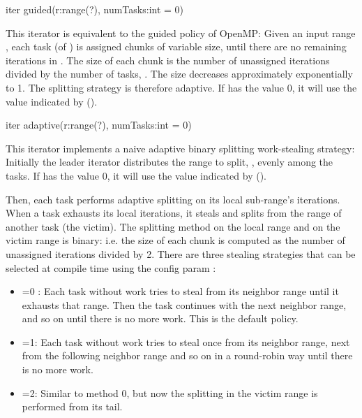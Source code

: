 \begin{protohead}
iter guided(r:range(?), numTasks:int = 0)
\end{protohead}
\begin{protobody}
  This iterator is equivalent to the guided policy of OpenMP: Given an
  input range , each task (of ) is assigned
  chunks of variable size, until there are no remaining iterations in
  . The size of each chunk is the number of unassigned
  iterations divided by the number of tasks, . The size
  decreases approximately exponentially to 1. The splitting strategy
  is therefore adaptive.  If  has the value 0, it will
  use the value indicated by 
  ().

\end{protobody}

\begin{protohead}
iter adaptive(r:range(?), numTasks:int = 0)
\end{protohead}
\begin{protobody}
  This iterator implements a naive adaptive binary splitting
  work-stealing strategy: Initially the leader iterator distributes
  the range to split, , evenly among the 
  tasks.  If  has the value 0, it will use the value
  indicated by 
  ().

  Then, each task performs adaptive splitting on its local
  sub-range's iterations. When a task exhausts its local iterations,
  it steals and splits from the range of another task (the
  victim). The splitting method on the local range and on the victim
  range is binary: i.e. the size of each chunk is computed as the
  number of unassigned iterations divided by 2. There are three
  stealing strategies that can be selected at compile time using the
  config param :

\begin{itemize}

\item {}=0 : Each task without work tries to steal
  from its neighbor range until it exhausts that range. Then the task
  continues with the next neighbor range, and so on until there is no
  more work.  This is the default policy.

\item {}=1: Each task without work tries to steal
  once from its neighbor range, next from the following neighbor range
  and so on in a round-robin way until there is no more work.

\item {}=2: Similar to method 0, but now the
  splitting in the victim range is performed from its tail.
\end{itemize}

\end{protobody}


